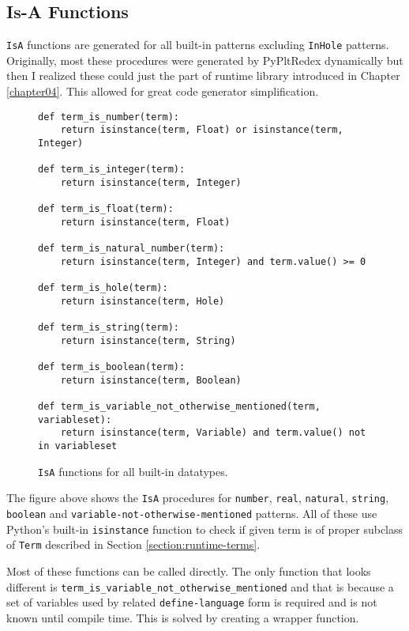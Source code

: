 \subsection{Is-A Functions}

\texttt{IsA} functions are generated for all built-in patterns excluding \texttt{InHole} patterns.  Originally, most these procedures were generated by PyPltRedex dynamically but then I realized these could just the part of runtime library introduced in Chapter \ref{chapter04}. This allowed for great code generator simplification.

\begin{figure}[H]
\begin{verbatim}
def term_is_number(term):
    return isinstance(term, Float) or isinstance(term, Integer)

def term_is_integer(term):
    return isinstance(term, Integer) 

def term_is_float(term):
    return isinstance(term, Float) 

def term_is_natural_number(term):
    return isinstance(term, Integer) and term.value() >= 0

def term_is_hole(term):
    return isinstance(term, Hole) 

def term_is_string(term):
    return isinstance(term, String) 

def term_is_boolean(term):
    return isinstance(term, Boolean) 

def term_is_variable_not_otherwise_mentioned(term, variableset):
    return isinstance(term, Variable) and term.value() not in variableset
\end{verbatim}
\caption{\texttt{IsA} functions for all built-in datatypes.}
\label{codegen-builtin-isa}
\end{figure}

The figure above shows the \texttt{IsA} procedures for \texttt{number}, \texttt{real}, \texttt{natural}, \texttt{string}, \texttt{boolean} and \texttt{variable-not-otherwise-mentioned} patterns. All of these use Python's built-in \texttt{isinstance} function to check if given term is of proper subclass of \texttt{Term} described in Section \ref{section:runtime-terms}.

Most of these functions can be called directly. The only function that looks different is \texttt{term\_is\_variable\_not\_otherwise\_mentioned} and that is because a set of variables used by related \texttt{define-language} form is required and is not known until compile time. This is solved by creating a wrapper function. 


